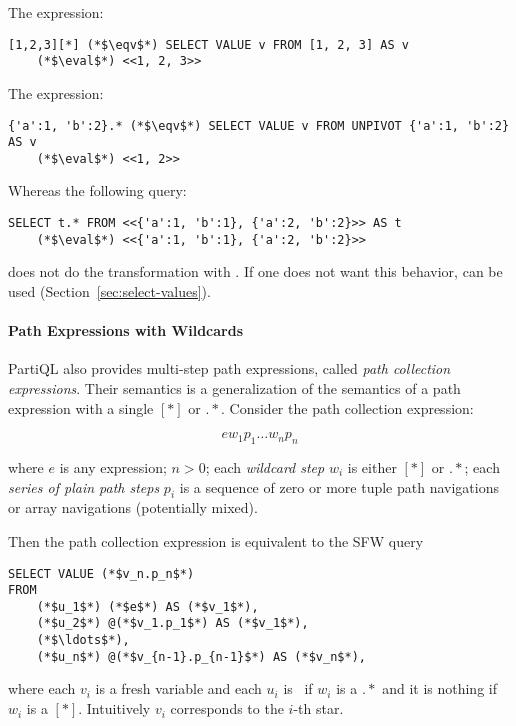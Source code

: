 \begin{example} 
The expression:

\begin{lstlisting}
[1,2,3][*] (*$\eqv$*) SELECT VALUE v FROM [1, 2, 3] AS v
    (*$\eval$*) <<1, 2, 3>>
\end{lstlisting}

\noindent The expression:

\begin{lstlisting}
{'a':1, 'b':2}.* (*$\eqv$*) SELECT VALUE v FROM UNPIVOT {'a':1, 'b':2} AS v
    (*$\eval$*) <<1, 2>>
\end{lstlisting}

\noindent Whereas the following query:

\begin{lstlisting}
SELECT t.* FROM <<{'a':1, 'b':1}, {'a':2, 'b':2}>> AS t
    (*$\eval$*) <<{'a':1, 'b':1}, {'a':2, 'b':2}>>
\end{lstlisting}

\noindent does not do the transformation with .  If one does not
want this behavior,  can be used
(Section~\ref{sec:select-values}).
\end{example}

\paragraph{Path Expressions with Wildcards}
PartiQL also provides multi-step path expressions, called \textit{path
collection expressions}. Their semantics is a generalization of the semantics of
a path expression with a single $[*]$ or $.*$. Consider the path collection
expression:

\[ e w_1 p_1 \ldots w_n p_n \]

\noindent where $e$ is any expression; $n>0$; each \textit{wildcard step}
$w_i$ is either $[*]$ or $.*$; each \textit{series of plain path steps} $p_i$ is
a sequence of zero or more tuple path navigations or array navigations
(potentially mixed). 

Then the path collection expression is equivalent to the SFW query 

\begin{lstlisting}
SELECT VALUE (*$v_n.p_n$*)
FROM
    (*$u_1$*) (*$e$*) AS (*$v_1$*),
    (*$u_2$*) @(*$v_1.p_1$*) AS (*$v_1$*),
    (*$\ldots$*),
    (*$u_n$*) @(*$v_{n-1}.p_{n-1}$*) AS (*$v_n$*),
\end{lstlisting}

\noindent where each $v_i$ is a fresh variable and each $u_i$ is \unpivot\ if
$w_i$ is a $.*$ and it is nothing if $w_i$ is a $[*]$. Intuitively $v_i$
corresponds to the $i$-th star.

